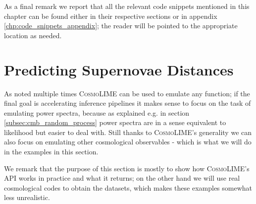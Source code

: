 As a final remark we report that all the relevant code snippets mentioned in this chapter can be found either in their respective sections or in appendix \ref{chp:code_snippets_appendix}; the reader will be pointed to the appropriate location as needed.


\section{Predicting Supernovae Distances}\label{sec:predicting_supernovae_distances}
As noted multiple times \textsc{CosmoLIME} can be used to emulate any function; if the final goal is accelerating inference pipelines it makes sense to focus on the task of emulating power spectra, because as explained e.g. in section \ref{subsec:cmb_random_process} power spectra are in a sense equivalent to likelihood but easier to deal with. Still thanks to \textsc{CosmoLIME}'s generality we can also focus on emulating other cosmological observables - which is what we will do in the examples in this section.

We remark that the purpose of this section is mostly to show how \textsc{CosmoLIME}'s API works in practice and what it returns; on the other hand we will use real cosmological codes to obtain the datasets, which makes these examples somewhat less unrealistic.


